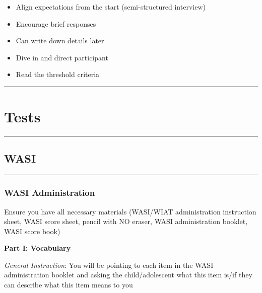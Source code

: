 \documentclass[]{book}
\providecommand{\tightlist}{%
  \setlength{\itemsep}{0pt}\setlength{\parskip}{0pt}}
\begin{document}
\begin{itemize}
\tightlist
\item
  Align expectations from the start (semi-structured interview)
\item
  Encourage brief responses
\item
  Can write down details later
\item
  Dive in and direct participant
\item
  Read the threshold criteria
\end{itemize}

\begin{center}\rule{0.5\linewidth}{0.5pt}\end{center}

\hypertarget{tests}{%
\section{Tests}\label{tests}}

\begin{center}\rule{0.5\linewidth}{0.5pt}\end{center}

\hypertarget{wasi}{%
\subsection{WASI}\label{wasi}}

\begin{center}\rule{0.5\linewidth}{0.5pt}\end{center}

\hypertarget{wasi-administration}{%
\subsubsection{WASI Administration}\label{wasi-administration}}

Ensure you have all necessary materials (WASI/WIAT administration instruction sheet, WASI score sheet, pencil with NO eraser, WASI administration booklet, WASI score book)

\textbf{Part I: Vocabulary}

\emph{General Instruction}: You will be pointing to each item in the WASI administration booklet and asking the child/adolescent what this item is/if they can describe what this item means to you
\end{document}
